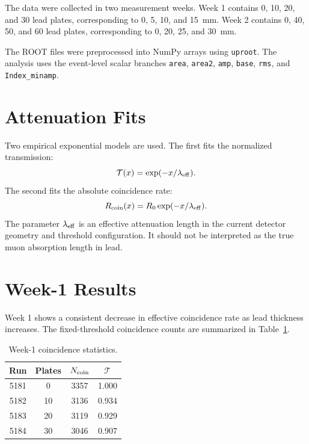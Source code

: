 \documentclass[aps,prl,twocolumn,superscriptaddress,nofootinbib]{revtex4-2}
\begin{document}
The data were collected in two measurement weeks. Week 1 contains 0, 10, 20, and 30 lead plates, corresponding to 0, 5, 10, and \SI{15}{mm}. Week 2 contains 0, 40, 50, and 60 lead plates, corresponding to 0, 20, 25, and \SI{30}{mm}.

The ROOT files were preprocessed into NumPy arrays using \texttt{uproot}. The analysis uses the event-level scalar branches \texttt{area}, \texttt{area2}, \texttt{amp}, \texttt{base}, \texttt{rms}, and \texttt{Index\_minamp}.

\section{Attenuation Fits}

Two empirical exponential models are used. The first fits the normalized transmission:
\begin{equation}
\mathcal{T}(x)=\exp(-x/\lambda_{\rm eff}).
\end{equation}
The second fits the absolute coincidence rate:
\begin{equation}
R_{\rm coin}(x)=R_0\exp(-x/\lambda_{\rm eff}).
\end{equation}
The parameter $\lambda_{\rm eff}$ is an effective attenuation length in the current detector geometry and threshold configuration. It should not be interpreted as the true muon absorption length in lead.

\section{Week-1 Results}

Week 1 shows a consistent decrease in effective coincidence rate as lead thickness increases. The fixed-threshold coincidence counts are summarized in Table~\ref{tab:week1}.

\begin{table}[h]
\caption{Week-1 coincidence statistics.}
\label{tab:week1}
\begin{ruledtabular}
\begin{tabular}{cccc}
Run & Plates & $N_{\rm coin}$ & $\mathcal{T}$\\
\hline
5181 & 0  & 3357 & 1.000\\
5182 & 10 & 3136 & 0.934\\
5183 & 20 & 3119 & 0.929\\
5184 & 30 & 3046 & 0.907\\
\end{tabular}
\end{ruledtabular}
\end{table}
\end{document}
